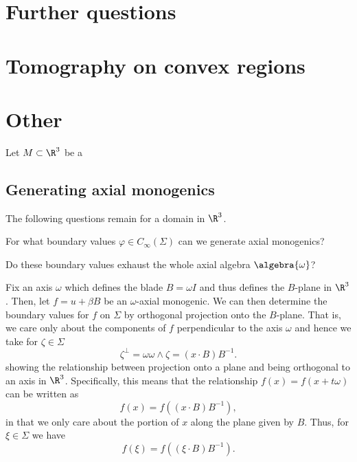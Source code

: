 \documentclass[12pt]{article}
\begin{document}
\section{Further questions}


\section{Tomography on convex regions}


\section{Other}



Let $M\subset \R^3$ be a 

\subsection{Generating axial monogenics}

The following questions remain for a domain in $\R^3$.

\begin{question}
    For what boundary values $\varphi \in C_\infty(\Sigma)$ can we generate axial monogenics?
\end{question}

\begin{question}
    Do these boundary values exhaust the whole axial algebra $\algebra{\omega}$?
\end{question}

Fix an axis $\omega$ which defines the blade $B = \omega I$ and thus defines the $B$-plane in $\R^3$.  Then, let $f=u+\beta B$ be an $\omega$-axial monogenic.  We can then determine the boundary values for $f$ on $\Sigma$ by orthogonal projection onto the $B$-plane.  That is, we care only about the components of $f$ perpendicular to the axis $\omega$ and hence we take for $\zeta \in \Sigma$
\[
\zeta^\perp = \omega \omega \wedge \zeta = (x\cdot B)B^{-1}.
\]
showing the relationship between projection onto a plane and being orthogonal to an axis in $\R^3$. Specifically, this means that the relationship $f(x)=f(x+t\omega)$ can be written as
\[
f(x)=f((x\cdot B)B^{-1}),
\]
in that we only care about the portion of $x$ along the plane given by $B$.  Thus, for $\xi \in \Sigma$ we have
\[
f(\xi) = f((\xi \cdot B)B^{-1}).
\]

\begin{figure}[H]
	\centering
	\resizebox{\columnwidth}{!}{}
\end{figure}
\end{document}
